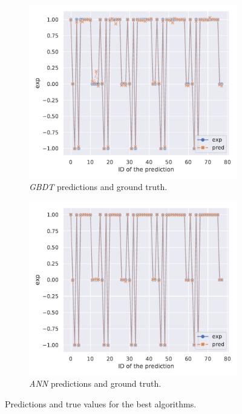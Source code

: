 \begin{figure}[htbp]
  \centering
  \begin{subfigure}{0.45\textwidth}
    \centering
    \includegraphics[width=\linewidth]{img/gbdt_lgbmregressor_test_lineplot}
    \caption{\emph{GBDT} predictions and ground truth.}
  \end{subfigure}
  \begin{subfigure}{0.45\textwidth}
    \centering
    \includegraphics[width=\linewidth]{img/ann_model_test_lineplot}
    \caption{\emph{ANN} predictions and ground truth.}
  \end{subfigure}
  \caption{Predictions and true values for the best algorithms.}
  \label{fig:lumps:best}
\end{figure}

